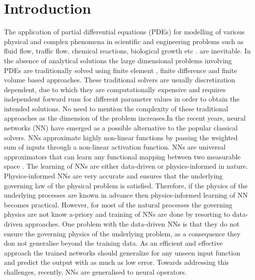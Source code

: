 \documentclass{article}
\begin{document}
\section*{Introduction}
The application of partial differential equations (PDEs) for modelling of various physical and complex phenomena in scientific and engineering problems such as fluid flow, traffic flow, chemical reactions, biological growth etc \cite{renardy2006introduction,sommerfeld1949partial,jones2009differential}. are inevitable. In the absence of analytical solutions the large dimensional problems involving PDEs are traditionally solved using finite element \cite{hughes2012finite}, finite difference \cite{strikwerda2004finite} and finite volume \cite{eymard2000finite} based approaches. These traditional solvers are usually discretization dependent, due to which they are computationally expensive and requires independent forward runs for different parameter values in order to obtain the intended solutions. 
No need to mention the complexity of these traditional approaches as the dimension of the problem increases.In the recent years, neural networks (NN) have emerged as a possible alternative to the popular classical solvers. NNs approximate highly non-linear functions by passing the weighted sum of inputs through a non-linear activation function. NNs are universal approximators that can learn any functional mapping between two measurable space \cite{hornik1989multilayer}. 
The learning of NNs are either data-driven \cite{raissi2018deep,rudy2017data,wu2020data,navaneeth2022koopman} or physics-informed \cite{raissi2019physics,goswami2020transfer,chakraborty2021transfer} in nature. Physics-informed NNs are very accurate and ensures that the underlying governing law of the physical problem is satisfied. Therefore, if the physics of the underlying processes are known in advance then physics-informed learning of NN becomes practical. However, for most of the natural processes the governing physics are not know a-priory and training of NNs are done by resorting to data-driven approaches. One problem with the data-driven NNs is that they do not ensure the governing physics of the underlying problem, as a consequence they don not generalise beyond the training data. 
As an efficient and effective approach the trained networks should generalize for any unseen input function and predict the output with as much as low error. Towards addressing this challenges, recently, NNs are generalised to neural operators.
\end{document}
